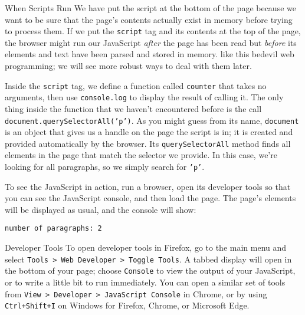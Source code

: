 \begin{aside}{When Scripts Run}
  We have put the script at the bottom of the page
  because we want to be sure that the page's contents actually exist in memory
  before trying to process them.
  If we put the \texttt{script} tag and its contents at the top of the page,
  the browser might run our JavaScript \emph{after} the page has been read
  but \emph{before} its elements and text have been parsed and stored in memory.
   like this bedevil web programming;
  we will see more robust ways to deal with them later.
\end{aside}

Inside the \texttt{script} tag,
we define a function called \texttt{counter} that takes no arguments,
then use \texttt{console.log} to display the result of calling it.
The only thing inside the function that we haven't encountered before
is the call \texttt{document.querySelectorAll('p')}.
As you might guess from its name,
\texttt{document} is an object that gives us a handle on the page the script is in;
it is created and provided automatically by the browser.
Its \texttt{querySelectorAll} method finds all elements in the page
that match the selector we provide.
In this case,
we're looking for all paragraphs,
so we simply search for \texttt{'p'}.

To see the JavaScript in action,
run a browser,
open its developer tools so that you can see the JavaScript console,
and then load the page.
The page's elements will be displayed as usual,
and the console will show:

\begin{verbatim}
number of paragraphs: 2
\end{verbatim}

\begin{aside}{Developer Tools}
  To open developer tools in Firefox,
  go to the main menu and select \texttt{Tools {\textgreater} Web\ Developer {\textgreater} Toggle\ Tools}.
  A tabbed display will open in the bottom of your page;
  choose \texttt{Console} to view the output of your JavaScript,
  or to write a little bit to run immediately.
  You can open a similar set of tools from \texttt{View {\textgreater} Developer {\textgreater} JavaScript\ Console} in Chrome,
  or by using \texttt{Ctrl+Shift+I} on Windows for Firefox, Chrome, or Microsoft Edge.
\end{aside}

